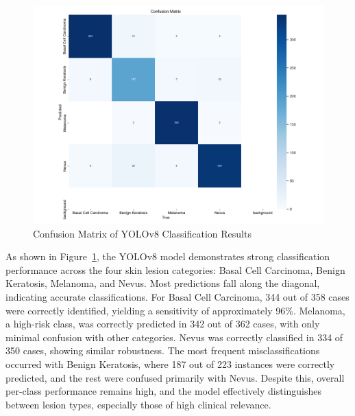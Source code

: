 \documentclass[a4paper,12pt]{report}
\begin{document}
\begin{spacing}{1.5}
    \begin{figure}[H]
        \centering
        \includegraphics[width=1\textwidth]{Pics/confusion_matrix.png}
        \caption{Confusion Matrix of YOLOv8 Classification Results}
        \label{fig:conf_matrix}
    \end{figure}
    
    As shown in Figure~\ref{fig:conf_matrix}, the YOLOv8 model demonstrates strong classification performance across the four skin lesion categories: Basal Cell Carcinoma, Benign Keratosis, Melanoma, and Nevus. Most predictions fall along the diagonal, indicating accurate classifications. For Basal Cell Carcinoma, 344 out of 358 cases were correctly identified, yielding a sensitivity of approximately 96\%. Melanoma, a high-risk class, was correctly predicted in 342 out of 362 cases, with only minimal confusion with other categories. Nevus was correctly classified in 334 of 350 cases, showing similar robustness. The most frequent misclassifications occurred with Benign Keratosis, where 187 out of 223 instances were correctly predicted, and the rest were confused primarily with Nevus. Despite this, overall per-class performance remains high, and the model effectively distinguishes between lesion types, especially those of high clinical relevance.
    

\end{spacing}
\end{document}
